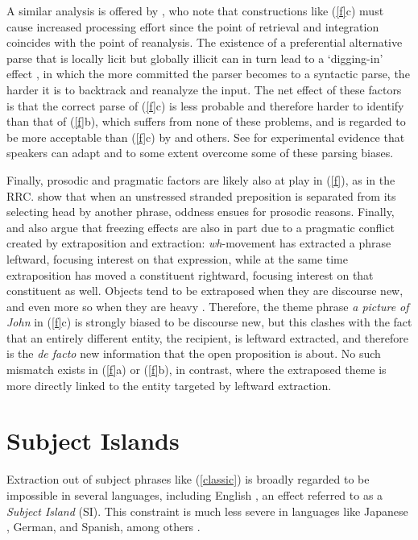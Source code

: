 \documentclass[output=paper]{langsci/langscibook}
\begin{document}
\noindent
A similar analysis is offered by \citet[477]{freezing}, who note that  constructions like (\ref{f}c) must cause increased processing effort since the point of retrieval and integration coincides with the point of reanalysis. The existence of a preferential alternative parse that is locally licit but globally illicit  can in turn lead to a  `digging-in' effect \citep{ferreirahend,ferreirahend2,tabor3}, in which the  more committed the parser  becomes to a syntactic parse, the  harder it is to backtrack and reanalyze the  input. The net effect of these factors is that the correct parse of
(\ref{f}c) is less probable and therefore harder to identify than that of  (\ref{f}b), which suffers from none of  these problems, and is  regarded to be more acceptable than
 (\ref{f}c) by \citet[453]{fodor78} and others. See \citet{chavesf} for experimental evidence that speakers
 can adapt and to some extent overcome some of these parsing biases.
 
 Finally, prosodic and pragmatic factors are likely also at  play in (\ref{f}), as in the RRC. \citet{huck} show that when an unstressed stranded preposition  is separated from its selecting head by another phrase, oddness ensues for prosodic reasons.  Finally,  \citet{huck} and  \citet{boling92} also
 argue that freezing effects are also in part due to a pragmatic conflict created by extraposition and extraction: \emph{wh}-movement has extracted a phrase leftward, focusing interest on that expression, while at the same time extraposition has moved a constituent rightward,  focusing interest on that constituent as well.  
Objects tend to be extraposed when they are discourse new, and even more so when they are heavy \citep[71]{wasowbook}. Therefore, the theme phrase \emph{a picture of John} in (\ref{f}c) is strongly biased to be discourse new,  but this clashes with the fact that an entirely different entity, the recipient, is leftward extracted, and therefore is the \emph{de facto} new information that the open proposition is about.  No such mismatch exists in (\ref{f}a) or (\ref{f}b), in contrast, where the extraposed theme is more directly linked to the  entity targeted by leftward extraction.


\section{Subject Islands}

Extraction out of subject phrases like (\ref{classic}) 
is broadly regarded to be impossible in several languages, including
English \cite{Ross67,chomsky73}, an effect referred to as a \emph{Subject Island} (SI).
This constraint is  much less severe  in languages like Japanese , German, and Spanish,
among others \citep{stepanov,jurkaetal,goodall11,greco,fukuda,polinsky13}. 
\end{document}
